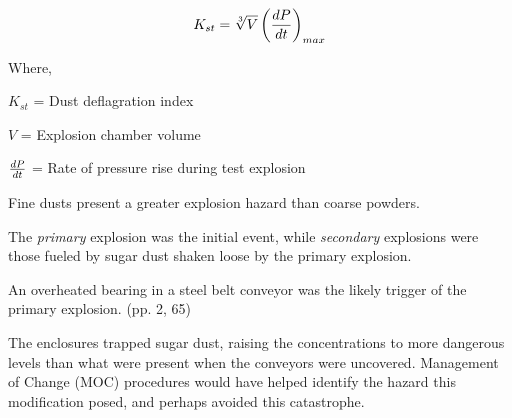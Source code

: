 







$$K_{st} = { {\root 3 \of {V}} \left({dP \over dt}\right)_{max} }$$

\noindent
Where,

$K_{st}$ = Dust deflagration index

$V$ = Explosion chamber volume

$dP \over dt$ = Rate of pressure rise during test explosion

\vskip 10pt

Fine dusts present a greater explosion hazard than coarse powders.

\vskip 10pt

The {\it primary} explosion was the initial event, while {\it secondary} explosions were those fueled by sugar dust shaken loose by the primary explosion.

\vskip 10pt

An overheated bearing in a steel belt conveyor was the likely trigger of the primary explosion. (pp. 2, 65)

\vskip 10pt

The enclosures trapped sugar dust, raising the concentrations to more dangerous levels than what were present when the conveyors were uncovered.  Management of Change (MOC) procedures would have helped identify the hazard this modification posed, and perhaps avoided this catastrophe.




